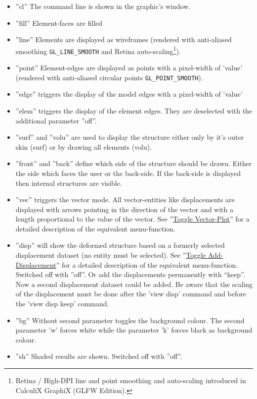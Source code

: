 \documentclass{article}
\providecommand{\htmlref}[2]{\hyperref[#2]{#1}}
\begin{document}
\begin{itemize}
\item ''cl'' The command line is shown in the graphic's window. 
\item ''fill'' Element-faces are filled 
\item ''line'' Elements are displayed as wireframes (rendered with anti-aliased smoothing \texttt{GL\_LINE\_SMOOTH} and Retina auto-scaling\footnote{Retina / High-DPI line and point smoothing and auto-scaling introduced in CalculiX GraphiX (GLFW Edition).}).
\item ''point'' Element-edges are displayed as points with a pixel-width of 'value' (rendered with anti-aliased circular points \texttt{GL\_POINT\_SMOOTH}).
\item ''edge'' triggers the display of the model edges with a pixel-width of 'value'
\item ''elem'' triggers the display of the element edges. They are deselected with the additional parameter ''off''.
\item ''surf'' and ''volu'' are used to display the structure either only by it's outer skin (surf) or by drawing all elements (volu). \item ''front'' and ''back'' define which side of the structure should be drawn. Either the side which faces the user or the back-side. If the back-side is displayed then internal structures are visible. 
\item ''vec'' triggers the vector mode. All vector-entities like displacements are displayed with arrows pointing in the direction of the vector and with a length proportional to the value of the vector. See ''\htmlref{Toggle Vector-Plot}{Toggle Vector-Plot}'' for a detailed description of the equivalent menu-function.
\item ''disp'' will show the deformed structure based on a formerly selected displacement dataset (no entity must be selected). See ''\htmlref{Toggle Add-Displacement}{Toggle Add-Displacement}'' for a detailed description of the equivalent menu-function. Switched off with ”off”. Or add the displacements permanently with ``keep''. Now a second displacement dataset could be added. Be aware that the scaling of the displacement must be done after the 'view disp' command and before the 'view disp keep' command.
\item ''bg'' Without second parameter toggles the background colour. The second parameter 'w' forces white while the parameter 'k' forces black as background colour.
\item ''sh'' Shaded results are shown. Switched off with ''off''. 

\end{itemize}
\end{document}
